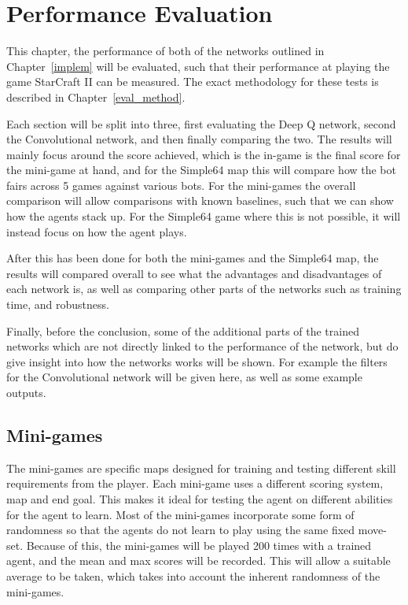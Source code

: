 \chapter{Performance Evaluation}%
\label{eval}

This chapter, the performance of both of the networks outlined in
Chapter~\ref{implem} will be evaluated, such that their performance at playing
the game StarCraft II can be measured. The exact methodology for these tests is
described in Chapter~\ref{eval_method}.

Each section will be split into three, first evaluating the Deep Q network,
second the Convolutional network, and then finally comparing the two. The
results will mainly focus around the score achieved, which is the in-game is the
final score for the mini-game at hand, and for the Simple64 map this will
compare how the bot fairs across 5 games against various bots. For the
mini-games the overall comparison will allow comparisons with known baselines,
such that we can show how the agents stack up. For the Simple64 game where this
is not possible, it will instead focus on how the agent plays.


After this has been done for both the mini-games and the Simple64 map, the
results will compared overall to see what the advantages and disadvantages of
each network is, as well as comparing other parts of the networks such as
training time, and robustness.

Finally, before the conclusion, some of the additional parts of the trained
networks which are not directly linked to the performance of the network, but
do give insight into how the networks works will be shown. For example the
filters for the Convolutional network will be given here, as well as some
example outputs.

\section{Mini-games}

The mini-games are specific maps designed for training and testing different
skill requirements from the player. Each mini-game uses a different scoring
system, map and end goal. This makes it ideal for testing the agent on different
abilities for the agent to learn. Most of the mini-games incorporate some form
of randomness so that the agents do not learn to play using the same fixed
move-set. Because of this, the mini-games will be played 200 times with a
trained agent, and the mean and max scores will be recorded. This will allow a
suitable average to be taken, which takes into account the inherent randomness
of the mini-games.

